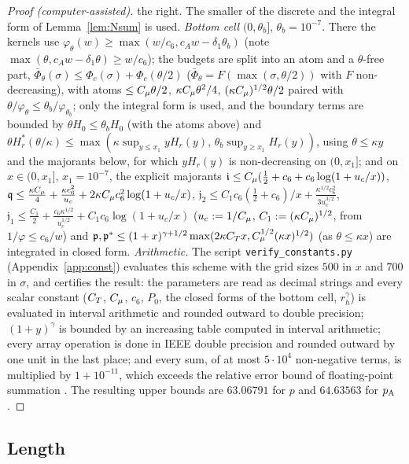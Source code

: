 \begin{proof}[Proof \textup(computer-assisted\textup)]
the right. The smaller of the discrete and the integral form of Lemma~\ref{lem:Nsum} is used.
\emph{Bottom cell} $(0,\theta_b]$, $\theta_b=10^{-7}$. There the kernels use $\varphi_\theta(w)\ge\max(w/c_6,c_Aw-\delta_1\theta_b)$ (note
$\max(\theta,c_Aw-\delta_1\theta)\ge w/c_6$); the budgets are split into an atom and a $\theta$-free part, $\bar\Phi_\theta(\sigma)\le\Phi_c(\sigma)+\Phi_c(\theta/2)$
($\bar\Phi_\theta=F(\max(\sigma,\theta/2))$ with $F$ non-decreasing), with atoms $\le C_\mu\theta/2$, $\kappa C_\mu\theta^2/4$, $(\kappa C_\mu)^{1/2}\theta/2$
paired with $\theta/\varphi_\theta\le\theta_b/\varphi_{\theta_b}$; only the integral form is used, and the boundary terms are bounded by $\theta H_0\le\theta_bH_0$ (with the atoms above) and $\theta H_r^*(\theta/\kappa)\le\max(\kappa\sup_{y\le x_1}yH_r(y),\,\theta_b\sup_{y\ge x_1}H_r(y))$, using $\theta\le\kappa y$ and the majorants below, for which $yH_r(y)$ is non-decreasing on $(0,x_1]$; and on $x\in(0,x_1]$, $x_1=10^{-7}$, the
explicit majorants $\mathfrak i\le C_\mu(\frac12+c_6+c_6\log(1+u_c/x))$, $\mathfrak q\le\frac{\kappa C_\mu}4+\frac{\kappa c_6^2}{u_c}+2\kappa C_\mu c_6^2\log(1+u_c/x)$,
$\mathfrak j_2\le C_1c_6(\frac12+c_6)/x+\frac{\kappa^{1/2}c_6^2}{3u_c^{3/2}}$, $\mathfrak j_1\le\frac{C_1}2+\frac{c_6\kappa^{1/2}}{u_c^{1/2}}+C_1c_6\log(1+u_c/x)$
($u_c:=1/C_\mu$, $C_1:=(\kappa C_\mu)^{1/2}$, from $1/\varphi\le c_6/w$) and $\mathfrak p,\mathfrak p^*\le(1+x)^{\gamma+1/2}\max(2\kappa C_T x,C_\mu^{1/2}(\kappa x)^{1/2})$
(as $\theta\le\kappa x$) are integrated in closed form.
\emph{Arithmetic.} The script \texttt{verify\_constants.py} (Appendix~\ref{app:const}) evaluates this scheme with the grid sizes $500$
in $x$ and $700$ in $\sigma$, and certifies the result: the parameters are read as decimal strings and every scalar constant ($C_T$, $C_\mu$,
$c_6$, $P_0$, the closed forms of the bottom cell, $r_h^\gamma$) is evaluated in interval arithmetic and rounded outward to double
precision; $(1+y)^\gamma$ is bounded by an increasing table computed in interval arithmetic; every array operation is done in IEEE double
precision and rounded outward by one unit in the last place; and every sum, of at most $5\cdot10^4$ non-negative terms, is multiplied by
$1+10^{-11}$, which exceeds the relative error bound of floating-point summation \cite[Lemma~3.1 and \S4.2]{Higham}. The resulting upper bounds are
$63.06791$ for $p$ and $64.63563$ for $p_{\mathrm A}$.
\end{proof}

\subsection{Length}

